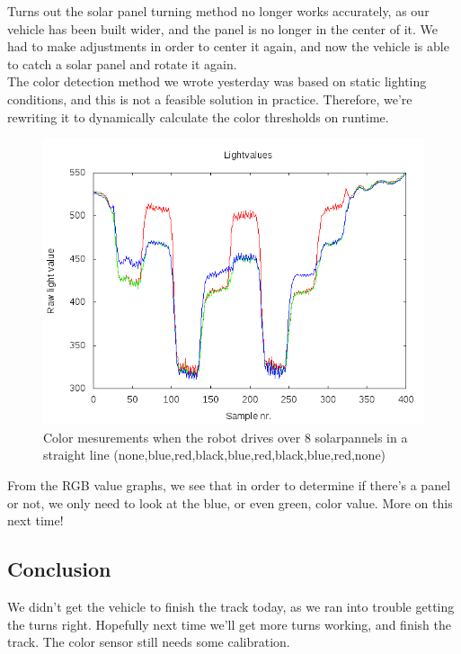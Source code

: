 Turns out the solar panel turning method no longer works accurately, as
our vehicle has been built wider, and the panel is no longer in the
center of it. We had to make adjustments in order to center it again,
and now the vehicle is able to catch a solar panel and rotate it
again.\\The color detection method we wrote yesterday was based on
static lighting conditions, and this is not a feasible solution in
practice. Therefore, we're rewriting it to dynamically calculate the
color thresholds on
runtime.
\begin{figure}[hbt]
  \centering
  \includegraphics[scale=0.5]{../experiments/2prototype/results/gnuplot/Colormesrun1.png}
  \caption{Color mesurements when the robot drives over 8 solarpannels in a straight line (none,blue,red,black,blue,red,black,blue,red,none)}
\end{figure}

From the RGB value graphs, we see that in order to determine if there's
a panel or not, we only need to look at the blue, or even green, color
value. More on this next time!

\subsection{Conclusion}

We didn't get the vehicle to finish the track today, as we ran into
trouble getting the turns right. Hopefully next time we'll get more
turns working, and finish the track. The color sensor still needs some
calibration.
